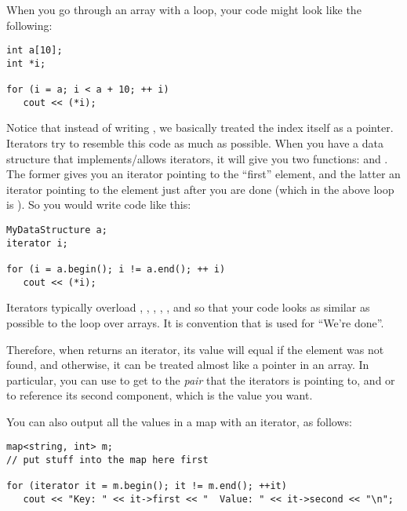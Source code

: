 When you go through an array with a loop, your code might look like
the following:

\begin{verbatim}
int a[10];
int *i;

for (i = a; i < a + 10; ++ i) 
   cout << (*i);
\end{verbatim}

Notice that instead of writing , we basically treated the
index itself as a pointer. Iterators try to resemble this code as much
as possible. When you have a data structure that implements/allows
iterators, it will give you two functions:  and
. The former gives you an iterator pointing to the
``first'' element, and the latter an iterator pointing to the element
just after you are done (which in the above loop is ). So
you would write code like this:

\begin{verbatim}
MyDataStructure a;
iterator i;

for (i = a.begin(); i != a.end(); ++ i)
   cout << (*i);
\end{verbatim}

Iterators typically overload \code{=}, \code{==}, \code{!=},
\code{++}, \code{*}, and \code{->} so that your code looks as similar
as possible to the loop over arrays. It is convention that
 is used for ``We're done''.

Therefore, when  returns an iterator, its value will
equal  if the element was not found, and otherwise, it
can be treated almost like a pointer in an array. In particular, you
can use  to get to the \emph{pair} that the iterators is
pointing to, and  or  to reference
its second component, which is the value you want.

You can also output all the values in a map with an iterator, as
follows:
\begin{verbatim}
map<string, int> m;
// put stuff into the map here first

for (iterator it = m.begin(); it != m.end(); ++it)
   cout << "Key: " << it->first << "  Value: " << it->second << "\n";
\end{verbatim}


